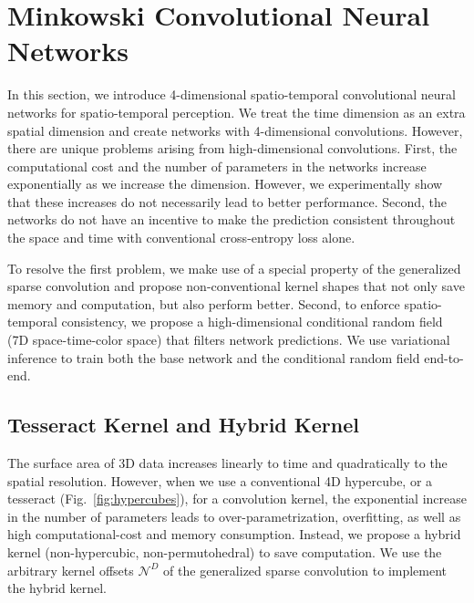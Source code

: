 \section{Minkowski Convolutional Neural Networks}
\label{sec:minkowski}

In this section, we introduce 4-dimensional spatio-temporal convolutional neural networks for spatio-temporal perception. We treat the time dimension as an extra spatial dimension and create networks with 4-dimensional convolutions. However, there are unique problems arising from high-dimensional convolutions. First, the computational cost and the number of parameters in the networks increase exponentially as we increase the dimension. However, we experimentally show that these increases do not necessarily lead to better performance. Second, the networks do not have an incentive to make the prediction consistent throughout the space and time with conventional cross-entropy loss alone.

To resolve the first problem, we make use of a special property of the generalized sparse convolution and propose non-conventional kernel shapes that not only save memory and computation, but also perform better. Second, to enforce spatio-temporal consistency, we propose a high-dimensional conditional random field (7D space-time-color space) that filters network predictions. We use variational inference to train both the base network and the conditional random field end-to-end.


\subsection{Tesseract Kernel and Hybrid Kernel}
\label{sec:hybrid_kernel}

The surface area of 3D data increases linearly to time and quadratically to the spatial resolution. However, when we use a conventional 4D hypercube, or a tesseract (Fig.~\ref{fig:hypercubes}), for a convolution kernel, the exponential increase in the number of parameters leads to over-parametrization, overfitting, as well as high computational-cost and memory consumption. Instead, we propose a hybrid kernel (non-hypercubic, non-permutohedral) to save computation. We use the arbitrary kernel offsets $\mathcal{N}^D$ of the generalized sparse convolution to implement the hybrid kernel.


